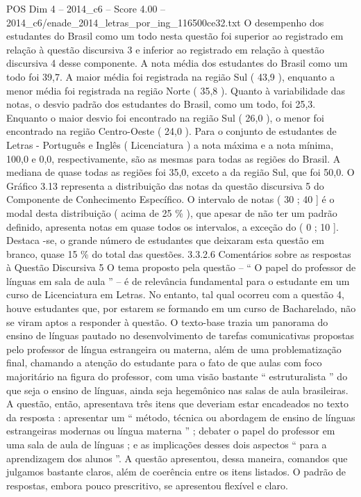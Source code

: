 \begin{textsample}{POS Dim 4 – 2014\_c6 – Score 4.00 – 2014\_c6/enade\_2014\_letras\_por\_ing\_116500ce32.txt}
O desempenho dos estudantes do Brasil como um todo nesta questão foi superior ao registrado em relação à questão discursiva 3 e inferior ao registrado em relação à questão discursiva 4 desse componente.
A nota média dos estudantes do Brasil como um todo foi 39,7.
A maior média foi registrada na região Sul ( 43,9 ), enquanto a menor média foi registrada na região Norte ( 35,8 ).
Quanto à variabilidade das notas, o desvio padrão dos estudantes do Brasil, como um todo, foi 25,3.
Enquanto o maior desvio foi encontrado na região Sul ( 26,0 ), o menor foi encontrado na região Centro-Oeste ( 24,0 ).
Para o conjunto de estudantes de Letras - Português e Inglês ( Licenciatura ) a nota máxima e a nota mínima, 100,0 e 0,0, respectivamente, são as mesmas para todas as regiões do Brasil.
A mediana de quase todas as regiões foi 35,0, exceto a da região Sul, que foi 50,0.
O Gráfico 3.13 representa a distribuição das notas da questão discursiva 5 do Componente de Conhecimento Específico.
O intervalo de notas ( 30 ; 40 ] é o modal desta distribuição ( acima de 25 \% ), que apesar de não ter um padrão definido, apresenta notas em quase todos os intervalos, a exceção do ( 0 ; 10 ].
Destaca -se, o grande número de estudantes que deixaram esta questão em branco, quase 15 \% do total das questões. 3.3.2.6 Comentários sobre as respostas à Questão Discursiva 5 O tema proposto pela questão – “ O papel do professor de línguas em sala de aula ” – é de relevância fundamental para o estudante em um curso de Licenciatura em Letras.
No entanto, tal qual ocorreu com a questão 4, houve estudantes que, por estarem se formando em um curso de Bacharelado, não se viram aptos a responder à questão.
O texto-base trazia um panorama do ensino de línguas pautado no desenvolvimento de tarefas comunicativas propostas pelo professor de língua estrangeira ou materna, além de uma problematização final, chamando a atenção do estudante para o fato de que aulas com foco majoritário na figura do professor, com uma visão bastante “ estruturalista ” do que seja o ensino de línguas, ainda seja hegemônico nas salas de aula brasileiras.
A questão, então, apresentava três itens que deveriam estar encadeados no texto da resposta : apresentar um “ método, técnica ou abordagem de ensino de línguas estrangeiras modernas ou língua materna ” ; debater o papel do professor em uma sala de aula de línguas ; e as implicações desses dois aspectos “ para a aprendizagem dos alunos ”.
A questão apresentou, dessa maneira, comandos que julgamos bastante claros, além de coerência entre os itens listados.
O padrão de respostas, embora pouco prescritivo, se apresentou flexível e claro.

\end{textsample}
